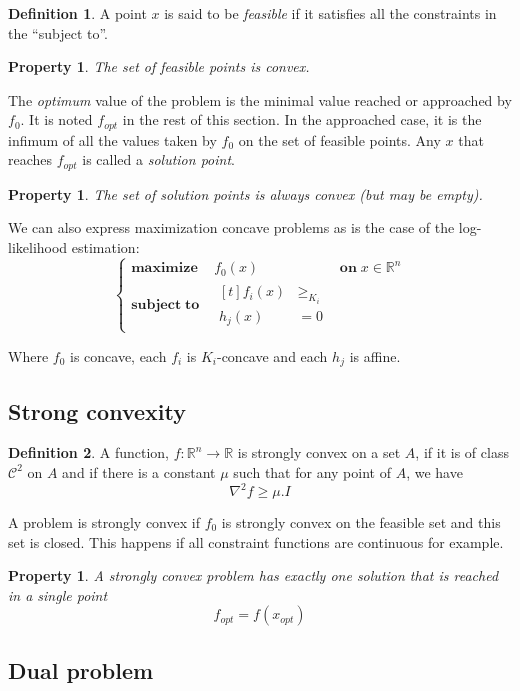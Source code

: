\documentclass[10pt,a4paper]{report}
\theoremstyle{plain}
\newtheorem{prop}[thm]{Property}
\theoremstyle{definition}
\newtheorem{defn}{Definition}[chapter]
\theoremstyle{remark}
\newcommand{\R}{\ensuremath{\mathbb{R}}}
\renewcommand{\geq}{\geqslant}
\newcommand{\class}[1]{{\mathscr{C}^{#1}}}
\newcommand{\maxima}[3]{\begin{cases}
    \mathbf{maximize}\,\quad #1& \mathbf{on}\; #2\\
    \mathbf{subject\;to}\quad \begin{aligned}[t]#3\end{aligned}
  \end{cases}}
\begin{document}
\begin{defn}
  A point $x$ is said to be \emph{feasible} if it satisfies all the constraints
  in the ``subject to''.
\end{defn}

\begin{prop}
  The set of feasible points is convex.
\end{prop}

The \emph{optimum} value of the problem is the minimal value reached or
approached by $f_0$. It
is noted $f_{opt}$ in the rest of this section. In the approached case, it is the
infimum of all the values taken by $f_0$ on the set of feasible points.
Any $x$ that reaches $f_{opt}$ is called a \emph{solution point}.

\begin{prop}
  The set of solution points is always convex (but may be empty).
\end{prop}

We can also express maximization concave problems as is the case of the
log-likelihood estimation:
\[\maxima{f_0(x)}{x \in \R^n}{f_i(x) &\geq_{K_i}\\\!h_j(x)&=0}\]

Where $f_0$ is concave, each $f_i$ is $K_i$-concave and each $h_j$ is affine.

\subsection{Strong convexity}

\begin{defn}
  A function, $f : \R^n \to \R$ is strongly convex on a set $A$, if it is of class $\class
  2$ on $A$ and if there is a constant $\mu$ such that
  for any point of $A$, we have
  \[\nabla^2 f \geq \mu.I\]
\end{defn}

A problem is strongly convex if $f_0$ is strongly convex on the feasible set and
this set is closed. This happens if all constraint functions are continuous for example.

\begin{prop}
  A strongly convex problem has exactly one solution that is reached in a single point
  \[f_{opt} = f(x_{opt})\]
\end{prop}

\subsection{Dual problem}
\end{document}
